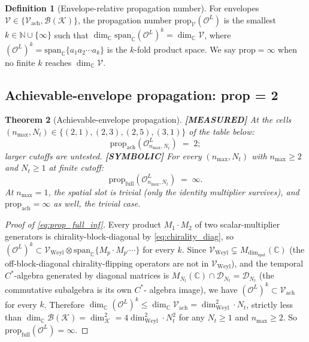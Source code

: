 \documentclass[11pt,a4paper]{article}
\theoremstyle{plain}
\newtheorem{theorem}{Theorem}[section]
\theoremstyle{definition}
\newtheorem{definition}[theorem]{Definition}
\newcommand{\nmax}{n_{\max}}
\newcommand{\Nt}{N_t}
\newcommand{\Krein}{\mathcal{K}}
\newcommand{\Op}{\mathcal{O}}
\newcommand{\Bcal}{\mathcal{B}}
\newcommand{\C}{\mathbb{C}}
\newcommand{\N}{\mathbb{N}}
\newcommand{\Mat}{M}
\newcommand{\prop}{\mathrm{prop}}
\newcommand{\spat}{\mathrm{spat}}
\newcommand{\Weyl}{\mathrm{Weyl}}
\newcommand{\achievable}{\mathrm{ach}}
\begin{document}
\begin{definition}[Envelope-relative propagation number]
\label{def:prop_env}
For envelopes $\mathcal{V} \in
\{\mathcal{V}_\achievable, \Bcal(\Krein)\}$, the propagation number
$\prop_{\mathcal{V}}(\Op^L)$ is the smallest $k \in \N \cup \{\infty\}$
such that $\dim_\C \mathrm{span}_\C(\Op^L)^k = \dim_\C \mathcal{V}$,
where $(\Op^L)^k = \mathrm{span}_\C\{a_1 a_2 \cdots a_k\}$ is the
$k$-fold product space. We say $\prop = \infty$ when no finite $k$
reaches $\dim_\C \mathcal{V}$.
\end{definition}

\subsection{Achievable-envelope propagation: prop = 2}
\label{sec:prop_ach}

\begin{theorem}[Achievable-envelope propagation]
\label{thm:prop_envelope_dependent}
\textbf{[MEASURED]} At the cells $(\nmax, \Nt) \in \{(2,1), (2,3),
(2,5), (3,1)\}$ of the table below:
\begin{equation}\label{eq:prop_ach}
   \prop_{\achievable}(\Op_{\nmax, \Nt}^L) \;=\; 2;
\end{equation}
larger cutoffs are untested.
\textbf{[SYMBOLIC]} For every $(\nmax, \Nt)$ with $\nmax \ge 2$ and $\Nt \ge 1$ at finite
cutoff:
\begin{equation}\label{eq:prop_full_inf}
   \prop_{\mathrm{full}}(\Op_{\nmax, \Nt}^L) \;=\; \infty.
\end{equation}
At $\nmax = 1$, the spatial slot is trivial (only the
identity multiplier survives), and $\prop_{\achievable} = \infty$ as
well, the trivial case.
\end{theorem}

\begin{proof}[Proof of \eqref{eq:prop_full_inf}]
Every product $M_1 \cdot M_2$ of two scalar-multiplier generators is
chirality-block-diagonal by \eqref{eq:chirality_diag}, so
$(\Op^L)^k \subset \mathcal{V}_\Weyl \otimes
\mathrm{span}_\C\{M_p \cdot M_{p'} \cdots\}$ for every
$k$. Since $\mathcal{V}_\Weyl \subsetneq \Mat_{\dim_\spat}(\C)$ (the
off-block-diagonal chirality-flipping operators are not in
$\mathcal{V}_\Weyl$), and the temporal $C^*$-algebra generated by
diagonal matrices is $\Mat_{\Nt}(\C) \cap \mathcal{D}_{\Nt} =
\mathcal{D}_{\Nt}$ (the commutative subalgebra is its own $C^*$-%
algebra image), we have $(\Op^L)^k \subset \mathcal{V}_\achievable$
for every $k$. Therefore
$\dim_\C (\Op^L)^k \le \dim_\C \mathcal{V}_\achievable =
\dim_\Weyl^2 \cdot \Nt$, strictly less than
$\dim_\C \Bcal(\Krein) = \dim_\Krein^2 = 4 \dim_\Weyl^2 \cdot \Nt^2$
for any $\Nt \ge 1$ and $\nmax \ge 2$. So
$\prop_{\mathrm{full}}(\Op^L) = \infty$.
\end{proof}
\end{document}
